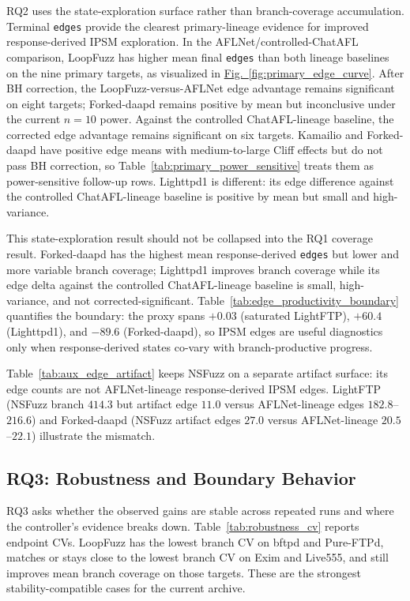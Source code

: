 \documentclass[final,5p,times,number]{elsarticle}
\newcommand{\figref}[1]{\hyperref[#1]{Fig.~\ref*{#1}}}
\begin{document}
RQ2 uses the state-exploration surface rather than branch-coverage accumulation. Terminal \texttt{edges} provide the clearest primary-lineage evidence for improved response-derived IPSM exploration. In the AFLNet/controlled-ChatAFL comparison, LoopFuzz has higher mean final \texttt{edges} than both lineage baselines on the nine primary targets, as visualized in \figref{fig:primary_edge_curve}. After BH correction, the LoopFuzz-versus-AFLNet edge advantage remains significant on eight targets; Forked-daapd remains positive by mean but inconclusive under the current $n=10$ power. Against the controlled ChatAFL-lineage baseline, the corrected edge advantage remains significant on six targets. Kamailio and Forked-daapd have positive edge means with medium-to-large Cliff effects but do not pass BH correction, so Table~\ref{tab:primary_power_sensitive} treats them as power-sensitive follow-up rows. Lighttpd1 is different: its edge difference against the controlled ChatAFL-lineage baseline is positive by mean but small and high-variance.

This state-exploration result should not be collapsed into the RQ1 coverage result. Forked-daapd has the highest mean response-derived \texttt{edges} but lower and more variable branch coverage; Lighttpd1 improves branch coverage while its edge delta against the controlled ChatAFL-lineage baseline is small, high-variance, and not corrected-significant. Table~\ref{tab:edge_productivity_boundary} quantifies the boundary: the proxy spans $+0.03$ (saturated LightFTP), $+60.4$ (Lighttpd1), and $-89.6$ (Forked-daapd), so IPSM edges are useful diagnostics only when response-derived states co-vary with branch-productive progress.

Table~\ref{tab:aux_edge_artifact} keeps NSFuzz on a separate artifact surface: its edge counts are not AFLNet-lineage response-derived IPSM edges. LightFTP (NSFuzz branch $414.3$ but artifact edge $11.0$ versus AFLNet-lineage edges $182.8$--$216.6$) and Forked-daapd (NSFuzz artifact edges $27.0$ versus AFLNet-lineage $20.5$--$22.1$) illustrate the mismatch.

\subsection{RQ3: Robustness and Boundary Behavior}

RQ3 asks whether the observed gains are stable across repeated runs and where the controller's evidence breaks down. Table~\ref{tab:robustness_cv} reports endpoint CVs. LoopFuzz has the lowest branch CV on bftpd and Pure-FTPd, matches or stays close to the lowest branch CV on Exim and Live555, and still improves mean branch coverage on those targets. These are the strongest stability-compatible cases for the current archive.
\end{document}
